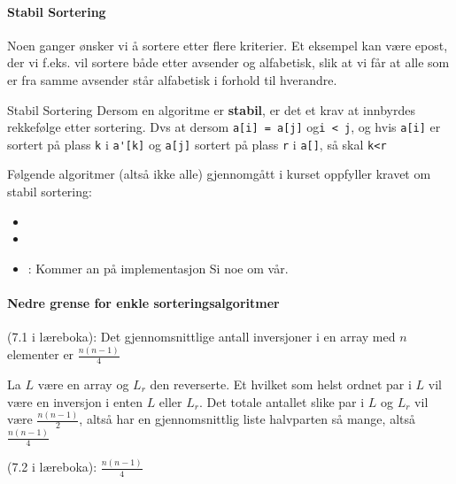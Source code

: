 \paragraph{\color{red}Stabil Sortering}\label{stabil}
Noen ganger ønsker vi å sortere etter flere kriterier. Et eksempel kan være
epost, der vi f.eks. vil sortere både etter avsender og alfabetisk, slik at vi
får at alle som er fra samme avsender står alfabetisk i forhold til hverandre.

\begin{definisjon} Stabil Sortering
  Dersom en algoritme er \textbf{stabil}, er det et krav at innbyrdes rekkefølge
  etter sortering. Dvs at dersom \verb|a[i] = a[j]| og\verb|i < j|, og hvis
  \verb|a[i]| er sortert på plass \verb|k| i \verb|a'[k]| og \verb|a[j]| sortert
  på plass \verb|r| i \verb|a[]|, så skal \verb|k<r| 
\end{definisjon}

Følgende algoritmer (altså ikke alle) gjennomgått i kurset oppfyller kravet om
stabil sortering:
\begin{itemize}
\item {} 
\item {} 
\item {}: Kommer an på implementasjon \color{red}Si noe om vår.
\end{itemize}


\paragraph{Nedre grense for enkle sorteringsalgoritmer}
\begin{teorem} (7.1 i læreboka): Det gjennomsnittlige antall inversjoner i en
  array med $n$ elementer er $\frac{n(n-1)}{4}$
\end{teorem}

\begin{bevis}
  La $L$ være en array og $L_r$ den reverserte. Et hvilket som helst ordnet par
  i $L$ vil være en inversjon i enten $L$ eller $L_r$. Det totale antallet slike
  par i $L$ og $L_r$ vil være $\frac{n(n-1)}{2}$, altså har en gjennomsnittlig
  liste halvparten så mange, altså $\frac{n(n-1)}{4}$ 
\end{bevis}

\begin{teorem} (7.2 i læreboka): 
  $\frac{n(n-1)}{4}$
\end{teorem}





